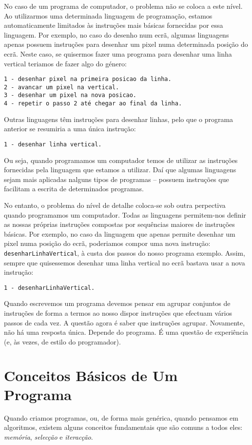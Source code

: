 No caso de um programa de computador, o problema não se coloca a este nível. Ao utilizarmos uma determinada linguagem de programação, estamos automaticamente limitados às instruções mais básicas fornecidas por essa linguagem. Por exemplo, no caso do desenho num ecrã, algumas linguagens apenas possuem instruções para desenhar um pixel numa determinada posição do ecrã. Neste caso, se quisermos fazer uma programa para desenhar uma linha vertical teriamos de fazer algo do género:
\begin{verbatim}
1 - desenhar pixel na primeira posicao da linha.
2 - avancar um pixel na vertical.
3 - desenhar um pixel na nova posicao.
4 - repetir o passo 2 até chegar ao final da linha.
\end{verbatim}

Outras linguagens têm instruções para desenhar linhas, pelo que o programa anterior se resumiria a uma única instrução:
\begin{verbatim}
1 - desenhar linha vertical.
\end{verbatim}

Ou seja, quando programamos um computador temos de utilizar as instruções fornecidas pela linguagem que estamos a utilizar. Daí que algumas linguagens sejam mais aplicadas nalguns tipos de programas -- possuem instruções que facilitam a escrita de determinados programas.

No entanto, o problema do nível de detalhe coloca-se sob outra perpectiva quando programamos um computador. Todas as linguagens permitem-nos definir as nossas próprias instruções compostas por sequências maiores de instruções básicas. Por exemplo, no caso da linguagem que apenas permite desenhar um pixel numa posição do ecrã, poderiamos compor uma nova instrução: \texttt{desenharLinhaVertical}, à custa dos passos do nosso programa exemplo. Assim, sempre que quisessemos desenhar uma linha vertical no ecrã bastava usar a nova instrução:
\begin{verbatim}
1 - desenharLinhaVertical.
\end{verbatim}

Quando escrevemos um programa devemos pensar em agrupar conjuntos de instruções de forma a termos ao nosso dispor instruções que efectuam vários passos de cada vez. 
A questão agora é saber que instruções agrupar. Novamente, não há uma resposta única. Depende do programa. É uma questão de experiência (e, às vezes, de estilo do programador).

\section{Conceitos Básicos de Um Programa}
Quando criamos programas, ou, de forma mais genérica, quando pensamos em algoritmos, existem alguns conceitos fundamentais que são comuns a todos eles: \emph{memória}, \emph{selecção} e \emph{iteracção}.

